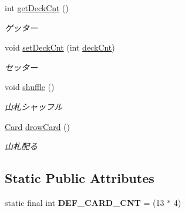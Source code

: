 \begin{DoxyCompactItemize}
int \hyperlink{classjp_1_1gr_1_1java__conf_1_1yuta__yoshinaga_1_1java__trumpcards_1_1_trump_cards_a4173ba48c18b6e9737b868c4fef0da47}{get\+Deck\+Cnt} ()
\begin{DoxyCompactList}\small\item\em ゲッター \end{DoxyCompactList}\item 
void \hyperlink{classjp_1_1gr_1_1java__conf_1_1yuta__yoshinaga_1_1java__trumpcards_1_1_trump_cards_ace7ea688cde83158d04d827b51153fdf}{set\+Deck\+Cnt} (int \hyperlink{classjp_1_1gr_1_1java__conf_1_1yuta__yoshinaga_1_1java__trumpcards_1_1_trump_cards_af6c55082de7cb0c1a873e97ce45a8597}{deck\+Cnt})
\begin{DoxyCompactList}\small\item\em セッター \end{DoxyCompactList}\item 
void \hyperlink{classjp_1_1gr_1_1java__conf_1_1yuta__yoshinaga_1_1java__trumpcards_1_1_trump_cards_af1dc4f53d030d1f772c847810e9367fb}{shuffle} ()
\begin{DoxyCompactList}\small\item\em 山札シャッフル \end{DoxyCompactList}\item 
\hyperlink{classjp_1_1gr_1_1java__conf_1_1yuta__yoshinaga_1_1java__trumpcards_1_1_card}{Card} \hyperlink{classjp_1_1gr_1_1java__conf_1_1yuta__yoshinaga_1_1java__trumpcards_1_1_trump_cards_a762812743e7d271596147b7dbcdd4ada}{drow\+Card} ()
\begin{DoxyCompactList}\small\item\em 山札配る \end{DoxyCompactList}\end{DoxyCompactItemize}
\subsection*{Static Public Attributes}
\begin{DoxyCompactItemize}
\item 
\mbox{\label{classjp_1_1gr_1_1java__conf_1_1yuta__yoshinaga_1_1java__trumpcards_1_1_trump_cards_afd2b67f2dcb5a18482ad32cc93dd8f6a}} 
static final int {\bfseries D\+E\+F\+\_\+\+C\+A\+R\+D\+\_\+\+C\+NT} = (13 $\ast$ 4)
\end{DoxyCompactItemize}
